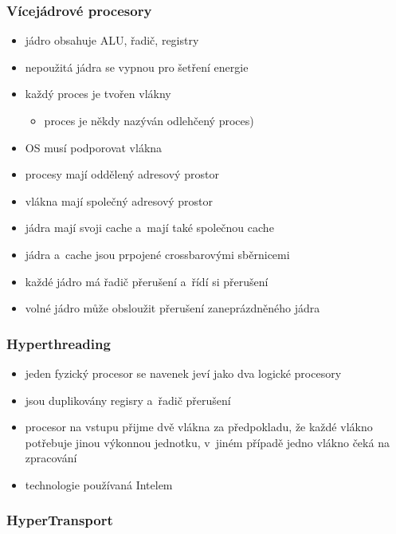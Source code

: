 \documentclass[a4paper,12pt]{article}
\providecommand{\tightlist}{%
\setlength{\itemsep}{0pt}\setlength{\parskip}{0pt}}
\begin{document}
\subsubsection{Vícejádrové procesory}

\begin{itemize}
\tightlist
\item jádro obsahuje ALU, řadič, registry
\item nepoužitá jádra se vypnou pro šetření energie
\item každý proces je tvořen vlákny

  \begin{itemize}
  \tightlist
  \item proces je někdy nazýván odlehčený proces)
  \end{itemize}
\item OS musí podporovat vlákna
\item procesy mají oddělený adresový prostor
\item vlákna mají společný adresový prostor
\item jádra mají svoji cache a~mají také společnou cache
\item jádra a~cache jsou prpojené crossbarovými sběrnicemi
\item každé jádro má řadič přerušení a~řídí si přerušení
\item volné jádro může obsloužit přerušení zaneprázdněného jádra
\end{itemize}

\subsubsection{Hyperthreading}

\begin{itemize}
\tightlist
\item jeden fyzický procesor se navenek jeví jako dva logické procesory
\item jsou duplikovány regisry a~řadič přerušení
\item procesor na vstupu přijme dvě vlákna za předpokladu, že každé vlákno
  potřebuje jinou výkonnou jednotku, v~jiném případě jedno vlákno čeká
  na zpracování
\item technologie používaná Intelem
\end{itemize}

\subsubsection{HyperTransport}
\end{document}
